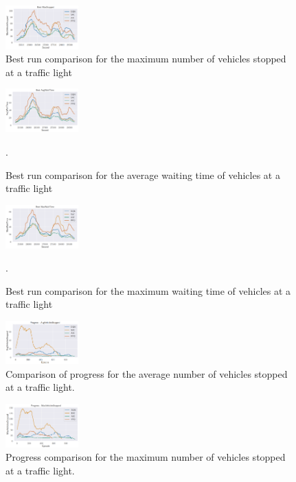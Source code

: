 \documentclass[a4paper,twoside]{article}
\begin{document}
\begin{figure}[!h]
	\includegraphics[width=0.25\textwidth]{ev_bestMaxStopped.png}
	\centering
	\caption{Best run comparison for the maximum number of vehicles stopped at a traffic light}
	\label{fig:ev_bestMaxStopped}
\end{figure}

\begin{figure}[!h]
	\includegraphics[width=0.25\textwidth]{ev_bestAvgTime.png}
	\centering
	\caption{Best run comparison for the average waiting time of vehicles at a traffic light}.
	\label{fig:ev_bestAvgTime}
\end{figure}

\begin{figure}[!h]
	\includegraphics[width=0.25\textwidth]{ev_bestMaxTime.png}
	\centering
	\caption{Best run comparison for the maximum waiting time of vehicles at a traffic light}.
	\label{fig:ev_bestMaxTime}
\end{figure}

\begin{figure}[!h]
	\includegraphics[width=0.25\textwidth]{ev_progressAvgStopped.png}
	\centering
	\caption{Comparison of progress for the average number of vehicles stopped at a traffic light.}
	\label{fig:ev_progressAvgStopped}
\end{figure}

\begin{figure}[!h]
	\includegraphics[width=0.25\textwidth]{ev_progressMaxStopped.png}
	\centering
	\caption{Progress comparison for the maximum number of vehicles stopped at a traffic light.}
	\label{fig:ev_progressMaxStopped}
\end{figure}
\end{document}
